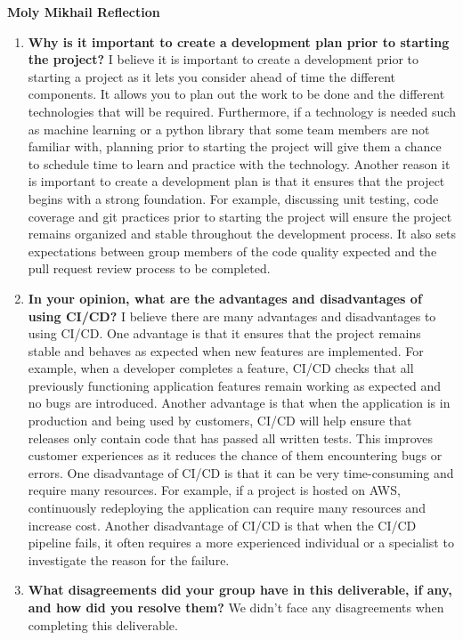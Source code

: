 \documentclass{article}
\begin{document}
\textbf{Moly Mikhail Reflection}
\begin{enumerate}
    \item  \textbf{Why is it important to create a development plan prior to starting the
    project?} \newline
    I believe it is important to create a development prior to starting a project as it lets you consider ahead of time the different 
    components. It allows you to plan out the work to be done and the different technologies that will be required. Furthermore, if a technology 
    is needed such as machine learning or a python library that some team members are not familiar with, planning prior to starting the project will give
    them a chance to schedule time to learn and practice with the technology. Another reason it is important to create a development plan is that it ensures that the project begins with a strong foundation.
    For example, discussing unit testing, code coverage and git practices prior to starting the project will ensure the project remains organized and stable throughout the development process. It also sets 
    expectations between group members of the code quality expected and the pull request review process to be completed.
    
    \item \textbf{In your opinion, what are the advantages and disadvantages of using
    CI/CD?} \newline
    I believe there are many advantages and disadvantages to using CI/CD. One advantage is that it ensures that the project remains stable and behaves as expected when new features are implemented. 
    For example, when a developer completes a feature, CI/CD checks that all previously functioning application features remain working as expected and no bugs are introduced. Another advantage
    is that when the application is in production and being used by customers, CI/CD will help ensure that releases only contain code that has passed all written tests.  This improves customer experiences
    as it reduces the chance of them encountering bugs or errors.  
    One disadvantage of CI/CD is that it can be very time-consuming and require many resources. For example, if a project is hosted on AWS, continuously redeploying the application
    can require many resources and increase cost. Another disadvantage of CI/CD is that when the CI/CD pipeline fails, it often requires a more 
    experienced individual or a specialist to investigate the reason for the failure.

    \item \textbf{What disagreements did your group have in this deliverable, if any,
    and how did you resolve them?}
    We didn't face any disagreements when completing this deliverable. 

\end{enumerate}
\end{document}
